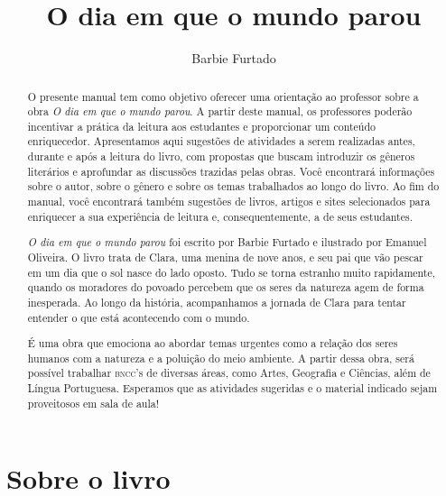 \documentclass[11pt]{extarticle}
\newcommand{\AutorLivro}{Barbie Furtado}
\newcommand{\TituloLivro}{O dia em que o mundo parou}
\newcommand{\colaborador}{Ana Lancman}
\begin{document}
\title{\TituloLivro}
\author{\AutorLivro}
\def\authornotes{\colaborador}

\date{}
\maketitle


\tableofcontents


\begin{abstract}

O presente manual tem como objetivo oferecer uma orientação ao professor sobre a obra \textit{O dia em que o mundo parou}. A partir deste manual, os professores poderão incentivar a prática da leitura aos estudantes e proporcionar um conteúdo enriquecedor. Apresentamos aqui sugestões de atividades a serem realizadas antes, durante e após a leitura do livro, com propostas que buscam introduzir os gêneros literários e aprofundar as discussões trazidas pelas obras. Você encontrará informações sobre o autor, sobre o gênero e sobre os temas trabalhados ao longo do livro. Ao fim do manual, você encontrará também sugestões de livros, artigos e sites selecionados para enriquecer a sua experiência de leitura e, consequentemente, a de seus estudantes.

\textit{O dia em que o mundo parou} foi escrito por Barbie Furtado e ilustrado por Emanuel Oliveira. O livro trata de Clara, uma menina de nove anos, e seu pai que vão pescar em um dia que o sol nasce do lado oposto. Tudo se torna estranho muito rapidamente, quando os moradores do povoado percebem que os seres da natureza agem de forma inesperada. Ao longo da história, acompanhamos a jornada de Clara para tentar entender o que está acontecendo com o mundo.

É uma obra que emociona ao abordar temas urgentes como a relação dos seres humanos com a natureza e a poluição do meio ambiente. A partir dessa obra, será possível trabalhar \textsc{bncc}'s de diversas áreas, como Artes, Geografia e Ciências, além de Língua Portuguesa. Esperamos que as atividades sugeridas e o material indicado sejam proveitosos em sala de aula! 

\end{abstract}
\section{Sobre o livro}
\end{document}
